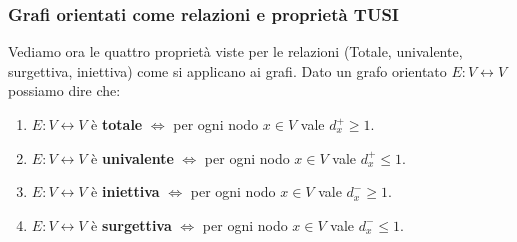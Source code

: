 \subsubsection{Grafi orientati come relazioni e proprietà TUSI}
Vediamo ora le quattro proprietà viste per le relazioni (Totale, univalente, surgettiva, iniettiva) come si applicano ai grafi. Dato un grafo orientato $E: V \leftrightarrow V$ possiamo dire che:
\begin{enumerate}
    \item $E: V \leftrightarrow V$ è \textbf{totale} $\Longleftrightarrow$ per ogni nodo $x \in V$ vale $d^+_x \geq 1$.
    \item $E: V \leftrightarrow V$ è \textbf{univalente} $\Longleftrightarrow$ per ogni nodo $x \in V$ vale $d^+_x \leq 1$.
    \item $E: V \leftrightarrow V$ è \textbf{iniettiva} $\Longleftrightarrow$ per ogni nodo $x \in V$ vale $d^-_x \geq 1$.
    \item $E: V \leftrightarrow V$ è \textbf{surgettiva} $\Longleftrightarrow$ per ogni nodo $x \in V$ vale $d^-_x \leq 1$.
\end{enumerate}

